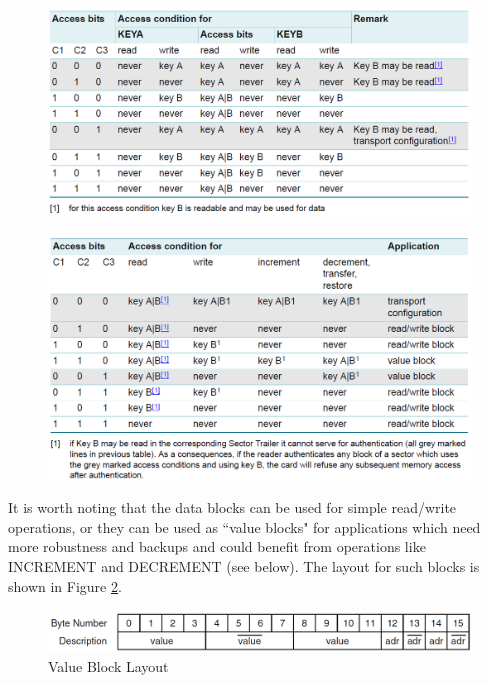 \documentclass[fleqn,10pt]{SelfArx} %
\begin{document}
\begin{figure}[h]
\centering
\begin{minipage}[b]{.47\textwidth}
  \centering
  \includegraphics[width=\textwidth]{img/trailer.png}
  \label{fig:trailer}
\end{minipage}
\begin{minipage}[b]{.47\textwidth}
  \centering
  \includegraphics[width=\textwidth]{img/data.png}
  \label{fig:data}
\end{minipage}
\end{figure}

It is worth noting that the data blocks can be used for simple read/write operations, or they can be used as ``value blocks" for applications which need more robustness and backups and could benefit from operations like INCREMENT and DECREMENT (see below). The layout for such blocks is shown in Figure \ref{fig:value}.

\begin{figure}[h]
  \hfill\includegraphics[width=0.7\linewidth]{img/value.png} \hspace*{\fill}
  \caption{Value Block Layout}
  \label{fig:value}
\end{figure}
\end{document}
